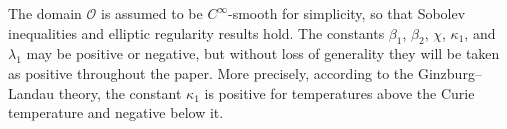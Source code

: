 \documentclass[11pt, reqno]{amsart}
\theoremstyle{definition}
\numberwithin{equation}{section}
\begin{document}
The domain $\mathscr{O}$ is assumed to be $C^\infty$-smooth for simplicity, so that Sobolev inequalities and elliptic regularity results hold. The constants $\beta_1$, $\beta_2$, $\chi$, $\kappa_1$, and $\lambda_1$ may be positive or negative, but without loss of generality they will be taken as positive throughout the paper. More precisely, according to the Ginzburg--Landau theory, the constant $\kappa_1$ is positive for temperatures above the Curie temperature and negative below it.
\end{document}
